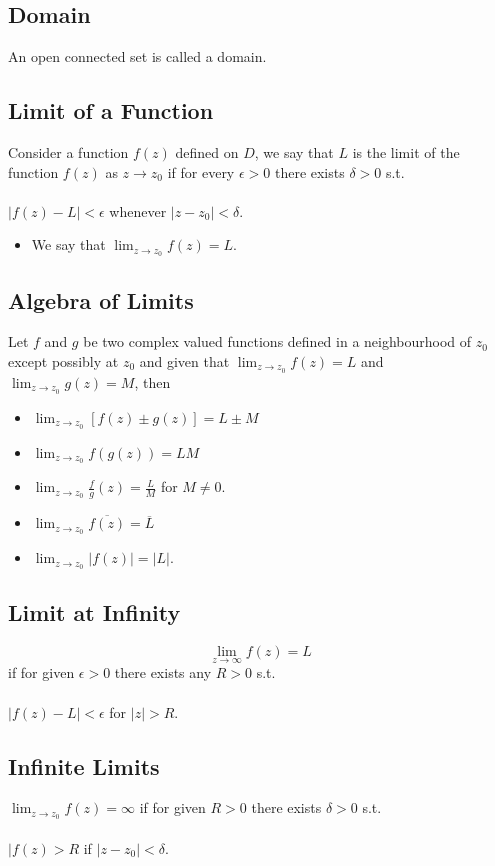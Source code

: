 \documentclass{article}
\begin{document}
\subsection{Domain}
An open connected set is called a domain.
\subsection{Limit of a Function}
Consider a function $f(z)$ defined on $D$, we say that $L$ is the limit of the function $f(z)$ as $z \to z_0$ if for every $\epsilon>0$ there exists $\delta>0$ s.t.
\\
\\
$|f(z)-L|<\epsilon$ whenever $|z-z_0|<\delta$.
\begin{itemize}
    \item We say that $\lim_{z \to z_0}f(z)=L$.
\end{itemize}
\subsection{Algebra of Limits}
Let $f$ and $g$ be two complex valued functions defined in a neighbourhood of $z_0$ except possibly at $z_0$ and given that $\lim_{z \to z_0}f(z)=L$ and $\lim_{z \to z_0}g(z)=M$, then
\begin{itemize}
    \item $\lim_{z \to z_0}[f(z) \pm g(z)]=L\pm M$
    \item $\lim_{z \to z_0}f(g(z))=LM$
    \item $\lim_{z\to z_0}\frac{f}{g}(z)=\frac{L}{M}$ for $M\neq 0$.
    \item $\lim_{z\to z_0}\overline{f(z)}=\overline{L}$
    \item $\lim_{z\to z_0}|f(z)|=|L|$.
\end{itemize}
\subsection{Limit at Infinity}
\[
\lim_{z\to \infty}f(z)=L
\]
if for given $\epsilon>0$ there exists any $R>0$ s.t.
\\
\\
$|f(z)-L|<\epsilon$ for $|z|>R$.
\subsection{Infinite Limits}
$\lim_{z\to z_0}f(z)=\infty$ if for given $R>0$ there exists $\delta>0$ s.t.
\\
\\
$|f(z)>R$ if $|z-z_0|<\delta$.
\end{document}
